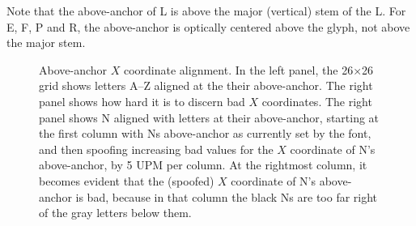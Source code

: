 \documentclass[landscape]{article}
\begin{document}
Note that the above-anchor of L is above the major (vertical) stem of the L. 
For E, F, P and R, the above-anchor is optically centered above the glyph, not above the major stem.

\def\ShiftA{-0.354em} \def\ShiftB{-0.267em} \def\ShiftC{-0.340em} \def\ShiftD{-0.306em}
\def\ShiftE{-0.281em} \def\ShiftF{-0.284em} \def\ShiftG{-0.365em} \def\ShiftH{-0.361em}
\def\ShiftI{-0.150em} \def\ShiftJ{-0.182em} \def\ShiftK{-0.336em} \def\ShiftL{-0.151em}
\def\ShiftM{-0.431em} \def\ShiftN{-0.346em} \def\ShiftO{-0.335em} \def\ShiftP{-0.277em}
\def\ShiftQ{-0.348em} \def\ShiftR{-0.269em} \def\ShiftS{-0.232em} \def\ShiftT{-0.307em}
\def\ShiftU{-0.346em} \def\ShiftV{-0.336em} \def\ShiftW{-0.450em} \def\ShiftX{-0.332em}
\def\ShiftY{-0.295em} \def\ShiftZ{-0.320em}
\def\Shift#1{\csname Shift#1\endcsname}
\def\Alphabet{A,B,C,D,E,F,G,H,I,J,K,L,M,N,O,P,Q,R,S,T,U,V,W,X,Y,Z}
\def\BaseBadNShift{-0.349}

\begin{figure}[htbp]
\captionsetup{justification=raggedright, singlelinecheck=false}
\caption{Above-anchor $X$ coordinate alignment.
	 In the left panel, the 26×26 grid shows letters A--Z aligned at the their above-anchor.
	 The right panel shows how hard it is to discern bad $X$ coordinates.
	 The right panel shows N aligned with letters at their above-anchor, 
	 starting at the first column with Ns above-anchor as currently set by the font, 
	 and then spoofing increasing bad values for the $X$ coordinate of N's above-anchor, 
	 by 5 UPM per column. At the rightmost column, it becomes evident that 
	 the (spoofed) $X$ coordinate of N's above-anchor is bad, because 
	 in that column the black Ns are too far right of the gray letters below them.
}
\label{fig:above-anchor-X-coordintate-alignment}
\end{figure}
\end{document}

